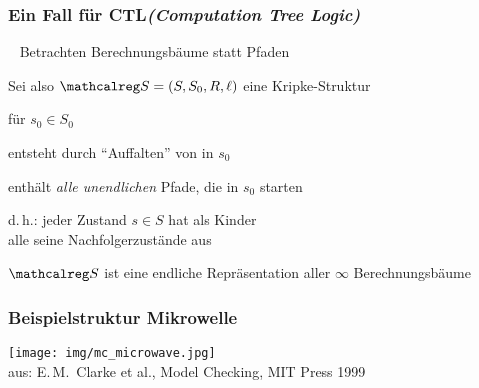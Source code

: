 \begin{frame}
  \frametitle{Ein Fall für CTL\hfill {\normalsize\emph{(Computation Tree Logic)}}}

  ~ Betrachten Berechnungsbäume statt Pfaden

  \par\bigskip
  Sei also $\calS = (S,S_0,R,\ell)$ eine Kripke-Struktur

  \par\bigskip
   für $s_0 \in S_0$
  \begin{Itemize}
    \item
      entsteht durch "`Auf{}falten"' von \calS in $s_0$
    \item
      enthält \emph{alle unendlichen} Pfade, die in $s_0$ starten
      \begin{Itemize}
        \item[] d.\,h.:
          jeder Zustand $s \in S$ hat als Kinder\\
          alle seine Nachfolgerzustände aus \calS
      \end{Itemize}
  \end{Itemize}

  \par\bigskip
  $\calS$ ist eine endliche Repräsentation aller $\infty$ Berechnungsbäume

%
\end{frame}

\begin{frame}
  \label{fra:bsp_mikrowelle}
  \frametitle{Beispielstruktur Mikrowelle}

  \begin{center}
    \begin{minipage}[b]{.7\textwidth}
      \texttt{[image: img/mc\_microwave.jpg]}\\
      {\footnotesize aus: E.\,M.\ Clarke et al., Model Checking, MIT Press 1999}
    \end{minipage}
  
    \par\vspace*{-\baselineskip}
    \Tafel
  \end{center}

\end{frame}

